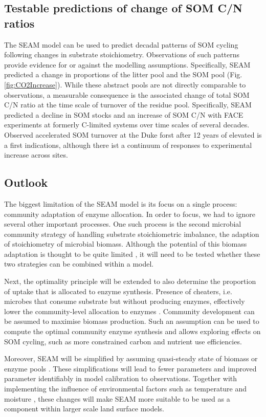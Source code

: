\subsection{Testable predictions of change of SOM C/N ratios}
The SEAM model can be used to predict decadal patterns of SOM cycling following
changes in substrate stoichiometry. Observations of such patterns provide evidence
for or against the modelling assumptions.
Specifically, SEAM predicted a change in proportions of the litter pool and the
SOM pool (Fig. \ref{fig:CO2Increase}). While these abstract pools are not
directly comparable to observations, a measurable consequence is the associated
change of total SOM C/N ratio at the time scale of turnover of the residue
pool. Specifically, SEAM predicted a decline in SOM stocks and an increase of
SOM C/N with FACE experiments at formerly C-limited systems over time scales of
several decades. Observed accelerated SOM turnover at the Duke forst after 12
years of elevated  \citep{Drake11} is a first indications, although
there ist a continuum of responses to experimental  increase across sites.
 
\subsection{Outlook} 
The biggest limitation of the SEAM model is its focus on a single process:
community adaptation of enzyme allocation. In order to focus, we had to ignore
several other important processes. One such process is the second microbial
community strategy of handling substrate stoichiometric imbalance, the adaption
of stoichiometry of microbial biomass. Although the potential of this biomass
adaptation is thought to be quite limited \citep{Mooshammer14}, it will need to
be tested whether these two strategies can be combined within a model.

Next, the optimality principle will be extended to also determine the proportion
of uptake that is allocated to enzyme synthesis. Presence of cheaters, i.e.
microbes that consume substrate but without producing enzymes, effectively lower
the community-level allocation to enzymes \citep{Kaiser14}. Community
development can be assumed to maximise biomass production. Such an assumption
can be used to compute the optimal community enzyme synthesis and allows
exploring effects on SOM cycling, such as more constrained carbon and nutrient
use efficiencies.

Moreover, SEAM will be simplified by assuming quasi-steady state of biomass or
enzyme pools \citep{Wutzler13}. These simplifications will lead to fewer
parameters and improved parameter identifiably in model calibration to
observations.
Together with implementing the influence of environmental factors such as
temperature and moisture \citep{Davidson12}, these changes will make SEAM more
suitable to be used as a component within larger scale land surface models.
 

